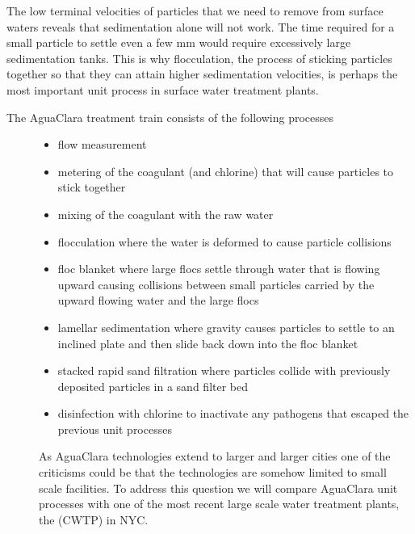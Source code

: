 \documentclass[letterpaper,10pt,english]{sphinxmanual}
\begin{document}
The low terminal velocities of particles that we need to remove from surface waters reveals that sedimentation alone will not work. The time required for a small particle to settle even a few mm would require excessively large sedimentation tanks. This is why flocculation, the process of sticking particles together so that they can attain higher sedimentation velocities, is perhaps the most important unit process in surface water treatment plants.
\begin{description}
\item[{The AguaClara treatment train consists of the following processes}] \leavevmode\begin{itemize}
\item {} 
flow measurement

\item {} 
metering of the coagulant (and chlorine) that will cause particles to stick together

\item {} 
mixing of the coagulant with the raw water

\item {} 
flocculation where the water is deformed to cause particle collisions

\item {} 
floc blanket where large flocs settle through water that is flowing upward causing collisions between small particles carried by the upward flowing water and the large flocs

\item {} 
lamellar sedimentation where gravity causes particles to settle to an inclined plate and then slide back down into the floc blanket

\item {} 
stacked rapid sand filtration where particles collide with previously deposited particles in a sand filter bed

\item {} 
disinfection with chlorine to inactivate any pathogens that escaped the previous unit processes

\end{itemize}

As AguaClara technologies extend to larger and larger cities one of the criticisms could be that the technologies are somehow limited to small scale facilities. To address this question we will compare AguaClara unit processes with one of the most recent large scale water treatment plants, the  (CWTP) in NYC.


\end{description}
\end{document}
